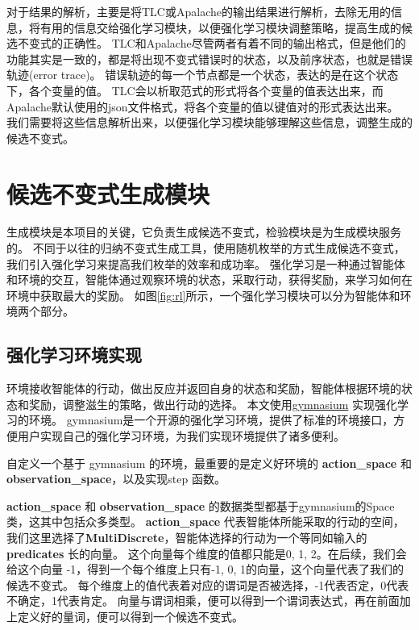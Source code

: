 对于结果的解析，主要是将TLC或Apalache的输出结果进行解析，去除无用的信息，将有用的信息交给强化学习模块，以便强化学习模块调整策略，提高生成的候选不变式的正确性。
TLC和Apalache尽管两者有着不同的输出格式，但是他们的功能其实是一致的，都是将出现不变式错误时的状态，以及前序状态，也就是错误轨迹(error trace)。
错误轨迹的每一个节点都是一个状态，表达的是在这个状态下，各个变量的值。
TLC会以析取范式的形式将各个变量的值表达出来，而Apalache默认使用的json文件格式，将各个变量的值以键值对的形式表达出来。
我们需要将这些信息解析出来，以便强化学习模块能够理解这些信息，调整生成的候选不变式。


\section{候选不变式生成模块}

生成模块是本项目的关键，它负责生成候选不变式，检验模块是为生成模块服务的。
不同于以往的归纳不变式生成工具，使用随机枚举的方式生成候选不变式，我们引入强化学习来提高我们枚举的效率和成功率。
强化学习是一种通过智能体和环境的交互，智能体通过观察环境的状态，采取行动，获得奖励，来学习如何在环境中获取最大的奖励。
如图\ref{fig:rl}所示，一个强化学习模块可以分为智能体和环境两个部分。

\subsection{强化学习环境实现}

环境接收智能体的行动，做出反应并返回自身的状态和奖励，智能体根据环境的状态和奖励，调整滋生的策略，做出行动的选择。
本文使用\href{https://gymnasium.farama.org/}{gymnasium} \cite{gymnasium} 实现强化学习的环境。
gymnasium是一个开源的强化学习环境，提供了标准的环境接口，方便用户实现自己的强化学习环境，为我们实现环境提供了诸多便利。

自定义一个基于 gymnasium 的环境，最重要的是定义好环境的 \textbf{action\_space} 和 \textbf{observation\_space}，以及实现step 函数。

\textbf{action\_space} 和 \textbf{observation\_space} 的数据类型都基于gymnasium的Space类，这其中包括众多类型。
\textbf{action\_space} 代表智能体所能采取的行动的空间，我们这里选择了\textbf{MultiDiscrete}，智能体选择的行动为一个等同如输入的 \textbf{predicates} 长的向量。
这个向量每个维度的值都只能是0, 1, 2。在后续，我们会给这个向量 -1，得到一个每个维度上只有-1, 0, 1的向量，这个向量代表了我们的候选不变式。
每个维度上的值代表着对应的谓词是否被选择，-1代表否定，0代表不确定，1代表肯定。
向量与谓词相乘，便可以得到一个谓词表达式，再在前面加上定义好的量词，便可以得到一个候选不变式。

